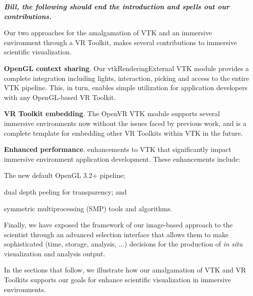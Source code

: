 \textbf{\textit{Bill, the following should end the introduction and spells out our contributions.}}

Our two approaches for the amalgamation of VTK and an immersive environment through a VR Toolkit, makes several contributions to immersive scientific visualization.

\textbf{OpenGL context sharing}. Our vtkRenderingExternal VTK module provides a complete integration including lights, interaction, picking and access to the entire VTK pipeline. This, in turn, enables simple utilization for application developers with any OpenGL-based VR Toolkit.

\textbf{VR Toolkit embedding}. The OpenVR VTK module supports several immersive environments now without the issues faced by previous work, and is a complete template for embedding other VR Toolkits within VTK in the future.

\textbf{Enhanced performance}. enhancements to VTK that significantly impact immersive environment application development. These enhancements include:

\begin{compactitem}
\item The new default OpenGL 3.2+ pipeline;
\item dual depth peeling for transparency; and 
\item symmetric multiprocessing (SMP) tools and algorithms.
\end{compactitem}

Finally, we have exposed the framework of our image-based approach to the scientist through an advanced selection interface that allows them to make sophisticated (time, storage, analysis, ...) decisions for the production of \textit{in situ} visualization and analysis output.

In the sections that follow, we illustrate how our amalgamation of VTK and VR Toolkits supports our goals for enhance scientific visualization in immersive environments.